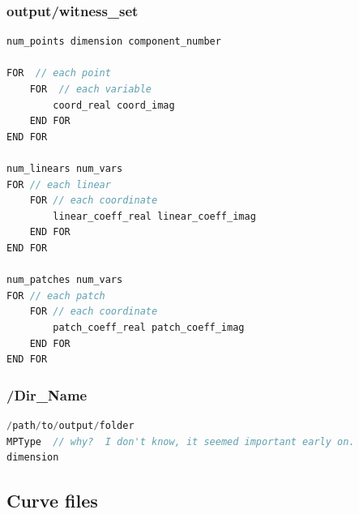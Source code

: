\subsubsection{output/witness\_set}
\label{sec:witness_set}


\begin{center}\begin{minipage}{0.9\linewidth}
\begin{lstlisting}[language=c++, caption={\tt output/witness\_set}, captionpos=b]
num_points dimension component_number

FOR  // each point
	FOR  // each variable
		coord_real coord_imag
	END FOR
END FOR

num_linears num_vars
FOR // each linear
	FOR // each coordinate
		linear_coeff_real linear_coeff_imag
	END FOR
END FOR

num_patches num_vars
FOR // each patch
	FOR // each coordinate
		patch_coeff_real patch_coeff_imag
	END FOR
END FOR


\end{lstlisting}
\end{minipage}\end{center}




\subsubsection{/Dir\_Name}
\label{sec:dir_name}


\begin{center}\begin{minipage}{0.9\linewidth}
\begin{lstlisting}[language=c++, caption={\tt output/V.vertex}, captionpos=b]
/path/to/output/folder
MPType  // why?  I don't know, it seemed important early on.  
dimension 
\end{lstlisting}
\end{minipage}\end{center}

















\clearpage
\subsection{Curve files}
\label{sec:curve_files}

